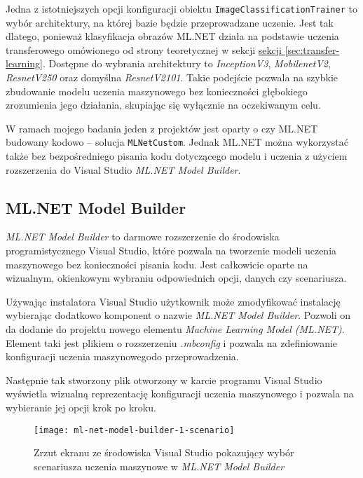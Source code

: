 Jedna z istotniejszych opcji konfiguracji obiektu \lstinline{ImageClassificationTrainer} to wybór architektury, na której bazie będzie przeprowadzane uczenie.
Jest tak dlatego, ponieważ klasyfikacja obrazów ML.NET działa na podstawie uczenia transferowego omówionego od strony teoretycznej w sekcji \hyperref[sec:transfer-learning]{sekcji \ref*{sec:transfer-learning}}.
Dostępne do wybrania architektury to \emph{InceptionV3}, \emph{MobilenetV2}, \emph{ResnetV250} oraz domyślna \emph{ResnetV2101}.
Takie podejście pozwala na szybkie zbudowanie modelu uczenia maszynowego bez konieczności głębokiego zrozumienia jego działania, skupiając się wyłącznie na oczekiwanym celu.

W ramach mojego badania jeden z projektów jest oparty o czy ML.NET budowany kodowo -- solucja \lstinline{MLNetCustom}.
Jednak ML.NET można wykorzystać także bez bezpośredniego pisania kodu dotyczącego modelu i uczenia z użyciem rozszerzenia do Visual Studio \emph{ML.NET Model Builder}.

\subsection{ML.NET Model Builder}
\label{sec:ml-net-model-builder}

\emph{ML.NET Model Builder} to darmowe rozszerzenie do środowiska programistycznego Visual Studio, które pozwala na tworzenie modeli uczenia maszynowego bez konieczności pisania kodu.
Jest całkowicie oparte na wizualnym, okienkowym wybraniu odpowiednich opcji, danych czy scenariusza.

Używając instalatora Visual Studio użytkownik może zmodyfikować instalację wybierając dodatkowo komponent o nazwie \emph{ML.NET Model Builder}.
Pozwoli on da dodanie do projektu nowego elementu \emph{Machine Learning Model (ML.NET)}.
Element taki jest plikiem o rozszerzeniu \emph{.mbconfig} i pozwala na zdefiniowanie konfiguracji uczenia maszynowegodo przeprowadzenia.

Następnie tak stworzony plik otworzony w karcie programu Visual Studio wyświetla wizualną reprezentację konfiguracji uczenia maszynowego i pozwala na wybieranie jej opcji krok po kroku.

\begin{figure}[ht]
  \texttt{[image: ml-net-model-builder-1-scenario]}
  \caption{Zrzut ekranu ze środowiska Visual Studio pokazujący wybór scenariusza uczenia maszynowe w \emph{ML.NET Model Builder}}
  \label{fig:ml-net-model-builder-1-scenario}
\end{figure}

